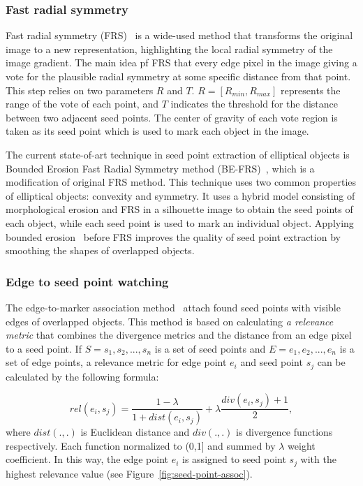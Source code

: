\documentclass{lutmscthesis}[2010/09/22]
\begin{document}
\subsubsection{Fast radial symmetry}

Fast radial symmetry (FRS)~\cite{FRS}  is a wide-used method that transforms the original
image to a new representation, highlighting the local radial symmetry of the image gradient.
The main idea pf FRS that  every edge pixel in the image giving a vote for the plausible radial symmetry at some specific distance from that point. This step relies on two parameters $R$ and $T$. $R = [R_{min} , R_{max}]$ represents the range of the vote of each point, and $T$ indicates the threshold for the distance between two adjacent seed points. The center
of gravity of each vote region is taken as its seed point which is used to mark
each object in the image. 

The current state-of-art technique in seed point extraction of elliptical objects is Bounded Erosion Fast
Radial Symmetry method (BE-FRS)~\cite{BE-FRS}, which is a modification of original FRS method. This technique uses two common properties of elliptical objects: convexity and symmetry.
It uses a hybrid model consisting of morphological erosion and FRS in a
silhouette image to obtain the seed points of each object, while each seed point
is used to mark an individual object. Applying bounded erosion~\cite{BE} before FRS improves the quality of seed point extraction by smoothing the shapes of overlapped objects.

\subsubsection{Edge to seed point watching}

The edge-to-marker association method~\cite{edge-to-seed-point} attach found seed points with visible edges of overlapped objects. This method is based on calculating \textit{a relevance metric} that combines the divergence metrics  and the distance from an edge pixel to a seed point. If $S ={s_1,s_2,...,s_n}$ is a set of seed points and $E ={e_1,e_2,...,e_n}$ is a set of edge points, a relevance metric for edge point $e_i$ and seed point $s_j$ can be calculated by the following formula:

\begin{equation}
    rel(e_i,s_j) = \frac{1-\lambda}{1+dist(e_i,s_j)}+\lambda\frac{div(e_i,s_j)+1}{2},
\end{equation} where $dist(.,.)$ is Euclidean distance and $div(.,.)$ is divergence functions respectively. Each function normalized to (0,1] and summed by $\lambda$ weight coefficient. In this way, the edge
point $e_i$ is assigned to seed point $s_j$ with the highest relevance
value (see Figure~\ref{fig:seed-point-assoc}).
\end{document}
